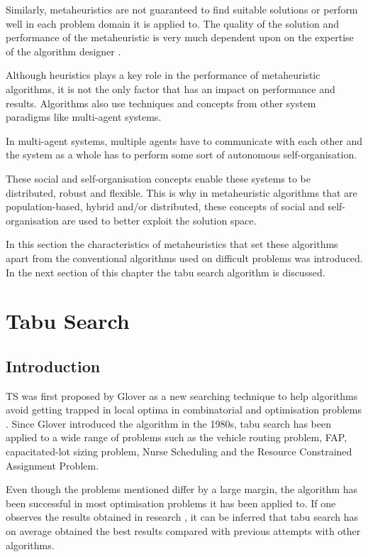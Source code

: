 Similarly, metaheuristics are not guaranteed to find suitable solutions or perform well in each problem domain it is applied to. The quality of the solution and performance of the metaheuristic is very much dependent upon on the expertise of the algorithm designer \cite{AutoComplexMeta}. 

Although heuristics plays a key role in the performance of metaheuristic algorithms, it is not the only factor that has an impact on performance and results. Algorithms also use techniques and concepts from other system paradigms like multi-agent systems\cite{Self-AdaptiveMeta}. 

In multi-agent systems, multiple agents have to communicate with each other and the system as a whole has to perform some sort of autonomous self-organisation\cite{Self-AdaptiveMeta}.

These social and self-organisation concepts enable these systems to be distributed, robust and flexible. This is why in metaheuristic algorithms that are population-based, hybrid and/or distributed, these concepts of social and self-organisation  are used to better exploit the solution space\cite{Self-AdaptiveMeta}.

In this section the characteristics of metaheuristics that set these algorithms apart from the conventional algorithms used on difficult problems was introduced. In the next section of this chapter the tabu search algorithm is discussed.
\section{Tabu Search}
\label{sec:tabusearch}
\subsection{Introduction}
\label{sec:TSIntroduction}
\gls{TS} was first proposed by Glover\cite{Glover89} as a new searching technique to help algorithms avoid getting trapped in local optima in combinatorial and optimisation problems \cite{TabuRCAProblem}. Since Glover introduced the algorithm in the 1980s, tabu search has been applied to a wide range of problems such as the vehicle routing problem\cite{TabuVechicleRoutingWithTimeWindows}, \gls{FAP}\cite{TabuMontemanniSmith}, capacitated-lot sizing problem\cite{TabuCarryOver}, Nurse Scheduling\cite{TabuNurse} and the Resource Constrained Assignment Problem\cite{TabuRCAProblem}. 

Even though the problems mentioned differ by a large margin, the algorithm has been successful in most optimisation problems it has been applied to. If one observes the results obtained in research \cite{TabuMontemanniSmith,tabuglobalplanning3g}, it can be inferred that tabu search has on average obtained the best results compared with previous attempts with other algorithms. 

